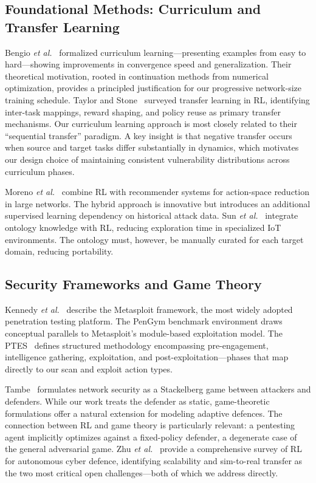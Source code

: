 \documentclass[conference]{IEEEtran}
\begin{document}
\subsection{Foundational Methods: Curriculum and Transfer Learning}

Bengio \emph{et al.}~\cite{bengio2009curriculum} formalized curriculum
learning---presenting examples from easy to hard---showing improvements
in convergence speed and generalization.  Their theoretical motivation,
rooted in continuation methods from numerical optimization, provides a
principled justification for our progressive network-size training
schedule.  Taylor and Stone~\cite{taylor2009transfer} surveyed transfer
learning in RL, identifying inter-task mappings, reward shaping, and
policy reuse as primary transfer mechanisms.  Our curriculum learning
approach is most closely related to their ``sequential transfer''
paradigm.  A key insight is that negative transfer occurs when source
and target tasks differ substantially in dynamics, which motivates our
design choice of maintaining consistent vulnerability distributions
across curriculum phases.

Moreno \emph{et al.}~\cite{moreno2025sensors} combine RL with
recommender systems for action-space reduction in large networks.  The
hybrid approach is innovative but introduces an additional supervised
learning dependency on historical attack data.  Sun \emph{et
al.}~\cite{sun2025plosone} integrate ontology knowledge with RL,
reducing exploration time in specialized IoT environments.  The
ontology must, however, be manually curated for each target domain,
reducing portability.

\subsection{Security Frameworks and Game Theory}

Kennedy \emph{et al.}~\cite{kennedy2011metasploit} describe the
Metasploit framework, the most widely adopted penetration testing
platform.  The PenGym benchmark environment draws conceptual parallels to
Metasploit's module-based exploitation model.  The PTES~\cite{ptes2014standard}
defines structured methodology encompassing pre-engagement, intelligence
gathering, exploitation, and post-exploitation---phases that map
directly to our scan and exploit action types.

Tambe~\cite{tambe2011gametheory} formulates network security as a
Stackelberg game between attackers and defenders.  While our work
treats the defender as static, game-theoretic formulations offer a
natural extension for modeling adaptive defences.  The connection
between RL and game theory is particularly relevant: a pentesting agent
implicitly optimizes against a fixed-policy defender, a degenerate case
of the general adversarial game.  Zhu \emph{et al.}~\cite{zhu2023survey}
provide a comprehensive survey of RL for autonomous cyber defence,
identifying scalability and sim-to-real transfer as the two most
critical open challenges---both of which we address directly.
\end{document}
